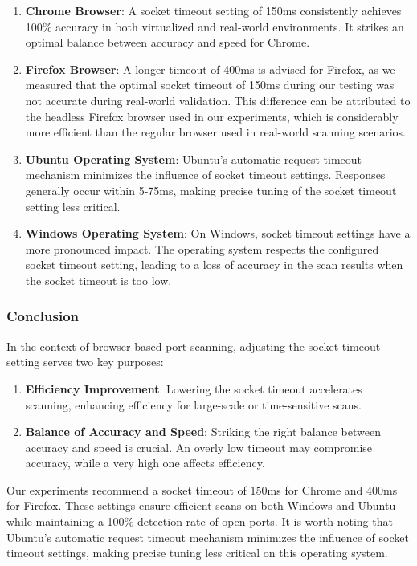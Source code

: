 \begin{enumerate}
    \item \textbf{Chrome Browser}: A socket timeout setting of 150ms consistently achieves 100\% accuracy in both virtualized and real-world environments. It strikes an optimal balance between accuracy and speed for Chrome.
    \item \textbf{Firefox Browser}: A longer timeout of 400ms is advised for Firefox, as we measured that the optimal socket timeout of 150ms during our testing was not accurate during real-world validation. This difference can be attributed to the headless Firefox browser used in our experiments, which is considerably more efficient than the regular browser used in real-world scanning scenarios.
    \item \textbf{Ubuntu Operating System}: Ubuntu's automatic request timeout mechanism minimizes the influence of socket timeout settings. Responses generally occur within 5-75ms, making precise tuning of the socket timeout setting less critical. 
    \item \textbf{Windows Operating System}: On Windows, socket timeout settings have a more pronounced impact. The operating system respects the configured socket timeout setting, leading to a loss of accuracy in the scan results when the socket timeout is too low. 
\end{enumerate}

\subsubsection{Conclusion}

In the context of browser-based port scanning, adjusting the socket timeout setting serves two key purposes:

\begin{enumerate}
    \item \textbf{Efficiency Improvement}: Lowering the socket timeout accelerates scanning, enhancing efficiency for large-scale or time-sensitive scans.
    \item \textbf{Balance of Accuracy and Speed}: Striking the right balance between accuracy and speed is crucial. An overly low timeout may compromise accuracy, while a very high one affects efficiency.
\end{enumerate}

Our experiments recommend a socket timeout of 150ms for Chrome and 400ms for Firefox. These settings ensure efficient scans on both Windows and Ubuntu while maintaining a 100\% detection rate of open ports. It is worth noting that Ubuntu's automatic request timeout mechanism minimizes the influence of socket timeout settings, making precise tuning less critical on this operating system.

